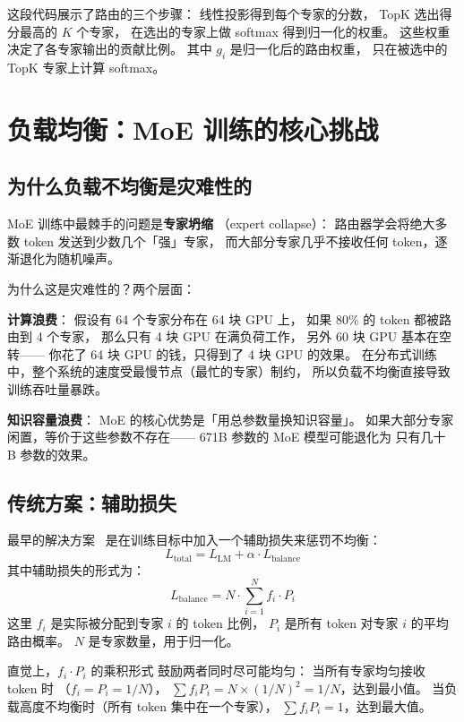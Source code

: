 这段代码展示了路由的三个步骤：
线性投影得到每个专家的分数，
TopK 选出得分最高的 $K$ 个专家，
在选出的专家上做 softmax 得到归一化的权重。
这些权重决定了各专家输出的贡献比例。
其中 $g_i$ 是归一化后的路由权重，
只在被选中的 TopK 专家上计算 softmax。

\section{负载均衡：MoE 训练的核心挑战}

\subsection{为什么负载不均衡是灾难性的}

MoE 训练中最棘手的问题是\textbf{专家坍缩}
（expert collapse）：
路由器学会将绝大多数 token 发送到少数几个「强」专家，
而大部分专家几乎不接收任何 token，逐渐退化为随机噪声。

为什么这是灾难性的？两个层面：

\textbf{计算浪费}：
假设有 64 个专家分布在 64 块 GPU 上，
如果 80\% 的 token 都被路由到 4 个专家，
那么只有 4 块 GPU 在满负荷工作，
另外 60 块 GPU 基本在空转——
你花了 64 块 GPU 的钱，只得到了 4 块 GPU 的效果。
在分布式训练中，整个系统的速度受最慢节点（最忙的专家）制约，
所以负载不均衡直接导致训练吞吐量暴跌。

\textbf{知识容量浪费}：
MoE 的核心优势是「用总参数量换知识容量」。
如果大部分专家闲置，等价于这些参数不存在——
671B 参数的 MoE 模型可能退化为
只有几十 B 参数的效果。

\subsection{传统方案：辅助损失}

最早的解决方案~\cite{shazeer2017moe}
是在训练目标中加入一个辅助损失来惩罚不均衡：
\begin{equation}
  L_{\mathrm{total}} = L_{\mathrm{LM}} + \alpha \cdot L_{\mathrm{balance}}
  \label{eq:aux-loss}
\end{equation}
其中辅助损失的形式为：
\begin{equation}
  L_{\mathrm{balance}} = N \cdot \sum_{i=1}^{N} f_i \cdot P_i
  \label{eq:balance-loss}
\end{equation}
这里 $f_i$ 是实际被分配到专家 $i$ 的 token 比例，
$P_i$ 是所有 token 对专家 $i$ 的平均路由概率。
$N$ 是专家数量，用于归一化。

直觉上，$f_i \cdot P_i$ 的乘积形式
鼓励两者同时尽可能均匀：
当所有专家均匀接收 token 时
（$f_i = P_i = 1/N$），
$\sum f_i P_i = N \times (1/N)^2 = 1/N$，达到最小值。
当负载高度不均衡时（所有 token 集中在一个专家），
$\sum f_i P_i = 1$，达到最大值。

